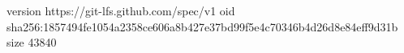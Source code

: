 version https://git-lfs.github.com/spec/v1
oid sha256:1857494fe1054a2358ce606a8b427e37bd99f5e4c70346b4d26d8e84eff9d31b
size 43840
